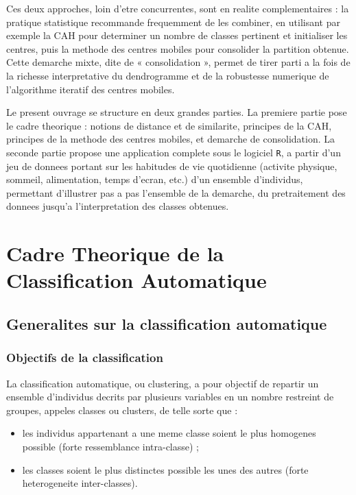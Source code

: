 \documentclass[12pt,a4paper]{book}
\newcommand{\R}{\texttt{R}}
\begin{document}
	Ces deux approches, loin d'etre concurrentes, sont en realite complementaires : la pratique statistique recommande frequemment de les combiner, en utilisant par exemple la CAH pour determiner un nombre de classes pertinent et initialiser les centres, puis la methode des centres mobiles pour consolider la partition obtenue. Cette demarche mixte, dite de « consolidation », permet de tirer parti a la fois de la richesse interpretative du dendrogramme et de la robustesse numerique de l'algorithme iteratif des centres mobiles.
	
	Le present ouvrage se structure en deux grandes parties. La premiere partie pose le cadre theorique : notions de distance et de similarite, principes de la CAH, principes de la methode des centres mobiles, et demarche de consolidation. La seconde partie propose une application complete sous le logiciel \R, a partir d'un jeu de donnees portant sur les habitudes de vie quotidienne (activite physique, sommeil, alimentation, temps d'ecran, etc.) d'un ensemble d'individus, permettant d'illustrer pas a pas l'ensemble de la demarche, du pretraitement des donnees jusqu'a l'interpretation des classes obtenues.
	
	\newpage
	
	\part{Cadre Theorique de la Classification Automatique}
	
	\chapter{Generalites sur la classification automatique}
	
	\section{Objectifs de la classification}
	
	La classification automatique, ou clustering, a pour objectif de repartir un ensemble d'individus decrits par plusieurs variables en un nombre restreint de groupes, appeles classes ou clusters, de telle sorte que :
	
	\begin{itemize}
		\item les individus appartenant a une meme classe soient le plus homogenes possible (forte ressemblance intra-classe) ;
		\item les classes soient le plus distinctes possible les unes des autres (forte heterogeneite inter-classes).
	\end{itemize}
	
\end{document}
